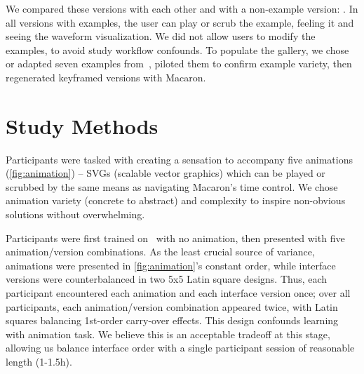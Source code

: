 We compared these versions with each other and with a non-example version:
\none.
%
%
In all versions with examples, the user can play or scrub the example, feeling it and seeing the waveform visualization.
We did not allow users to modify the examples, to avoid study workflow confounds.
To populate the gallery, we chose or adapted seven examples from~\cite{Seifi2015}, 
piloted them to confirm example variety, then regenerated keyframed versions with Macaron.




%
%
\section{Study Methods}
Participants were tasked with creating a sensation to accompany five animations (\autoref{fig:animation}) -- SVGs (scalable vector graphics)  which can be played or scrubbed by the same means as navigating Macaron's time control.
We chose animation variety (concrete to abstract) and complexity to inspire non-obvious solutions without overwhelming.

Participants were first trained on \none\ with no animation,
then presented with five animation/version combinations.
As the least crucial source of variance, animations were presented in \autoref{fig:animation}'s constant order, while 
interface versions were counterbalanced in two 5x5 Latin square designs.
Thus, each participant encountered each animation and each interface version once; over all participants, each animation/version combination appeared twice,
with Latin squares balancing 1st-order carry-over effects.
This design confounds learning with animation task. 
We believe this is an acceptable tradeoff at this stage, allowing us balance interface order with a single participant session of reasonable length (1-1.5h).


